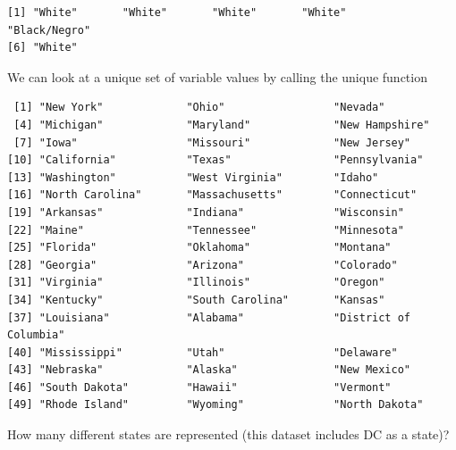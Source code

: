 \documentclass[
  letterpaper,
]{book}
\newenvironment{Shaded}{\begin{snugshade}}{\end{snugshade}}
\newcommand{\FunctionTok}[1]{\textcolor[rgb]{0.28,0.35,0.67}{#1}}
\newcommand{\NormalTok}[1]{\textcolor[rgb]{0.00,0.23,0.31}{#1}}
\newcommand{\SpecialCharTok}[1]{\textcolor[rgb]{0.37,0.37,0.37}{#1}}
\theoremstyle{definition}
\theoremstyle{definition}
\theoremstyle{plain}
\theoremstyle{definition}
\theoremstyle{plain}
\theoremstyle{plain}
\theoremstyle{remark}
\begin{document}
\begin{verbatim}
[1] "White"       "White"       "White"       "White"       "Black/Negro"
[6] "White"      
\end{verbatim}

We can look at a unique set of variable values by calling the unique
function

\begin{Shaded}
\end{Shaded}

\begin{verbatim}
 [1] "New York"             "Ohio"                 "Nevada"              
 [4] "Michigan"             "Maryland"             "New Hampshire"       
 [7] "Iowa"                 "Missouri"             "New Jersey"          
[10] "California"           "Texas"                "Pennsylvania"        
[13] "Washington"           "West Virginia"        "Idaho"               
[16] "North Carolina"       "Massachusetts"        "Connecticut"         
[19] "Arkansas"             "Indiana"              "Wisconsin"           
[22] "Maine"                "Tennessee"            "Minnesota"           
[25] "Florida"              "Oklahoma"             "Montana"             
[28] "Georgia"              "Arizona"              "Colorado"            
[31] "Virginia"             "Illinois"             "Oregon"              
[34] "Kentucky"             "South Carolina"       "Kansas"              
[37] "Louisiana"            "Alabama"              "District of Columbia"
[40] "Mississippi"          "Utah"                 "Delaware"            
[43] "Nebraska"             "Alaska"               "New Mexico"          
[46] "South Dakota"         "Hawaii"               "Vermont"             
[49] "Rhode Island"         "Wyoming"              "North Dakota"        
\end{verbatim}

How many different states are represented (this dataset includes DC as a
state)?

\begin{Shaded}
\end{Shaded}
\end{document}
